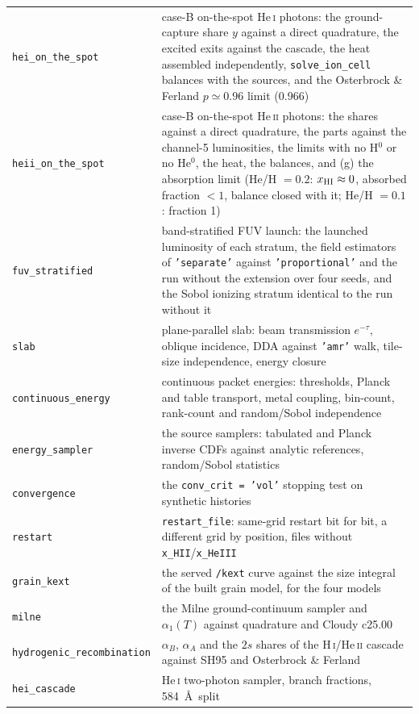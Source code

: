 \documentclass[english,a4paper]{my_memo}
\newcommand{\code}[1]{\texttt{#1}}
\begin{document}
{\begin{longtable}{lp{10.2cm}}
\code{hei\_on\_the\_spot} & case-B on-the-spot He\,\textsc{i} photons: the ground-capture share $y$ against a direct quadrature, the excited exits against the cascade, the heat assembled independently, \code{solve\_ion\_cell} balances with the sources, and the Osterbrock \& Ferland $p\simeq0.96$ limit (0.966) \\
\code{heii\_on\_the\_spot} & case-B on-the-spot He\,\textsc{ii} photons: the shares against a direct quadrature, the parts against the channel-5 luminosities, the limits with no H$^0$ or no He$^0$, the heat, the balances, and (g) the absorption limit (He/H $=0.2$: $x_{\rm HI}\approx0$, absorbed fraction $<1$, balance closed with it; He/H $=0.1$: fraction 1) \\
\code{fuv\_stratified} & band-stratified FUV launch: the launched luminosity of each stratum, the field estimators of \code{'separate'} against \code{'proportional'} and the run without the extension over four seeds, and the Sobol ionizing stratum identical to the run without it \\
\code{slab} & plane-parallel slab: beam transmission $e^{-\tau}$, oblique incidence, DDA against \code{'amr'} walk, tile-size independence, energy closure \\
\code{continuous\_energy} & continuous packet energies: thresholds, Planck and table transport, metal coupling, bin-count, rank-count and random/Sobol independence \\
\code{energy\_sampler} & the source samplers: tabulated and Planck inverse CDFs against analytic references, random/Sobol statistics \\
\code{convergence} & the \code{conv\_crit = 'vol'} stopping test on synthetic histories \\
\code{restart} & \code{restart\_file}: same-grid restart bit for bit, a different grid by position, files without \code{x\_HII}/\code{x\_HeIII} \\
\code{grain\_kext} & the served \code{/kext} curve against the size integral of the built grain model, for the four models \\
\code{milne} & the Milne ground-continuum sampler and $\alpha_1(T)$ against quadrature and Cloudy c25.00 \\
\code{hydrogenic\_recombination} & $\alpha_B$, $\alpha_A$ and the $2s$ shares of the H\,\textsc{i}/He\,\textsc{ii} cascade against SH95 and Osterbrock \& Ferland \\
\code{hei\_cascade} & He\,\textsc{i} two-photon sampler, branch fractions, 584~\AA\ split \\

\end{longtable}}
\end{document}

